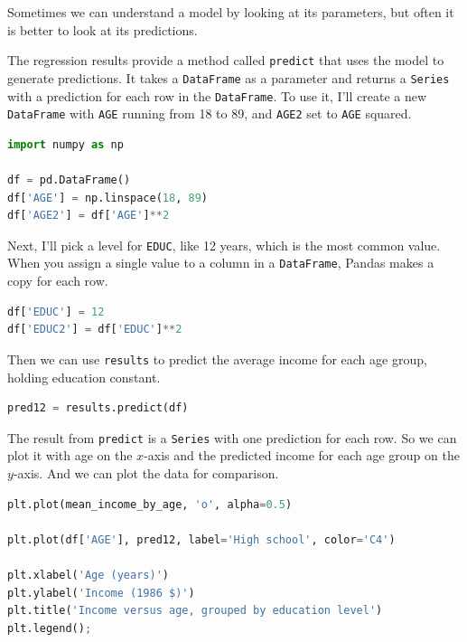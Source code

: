 Sometimes we can understand a model by looking at its parameters, but
often it is better to look at its predictions.

The regression results provide a method called
\passthrough{\lstinline!predict!} that uses the model to generate
predictions. It takes a \passthrough{\lstinline!DataFrame!} as a
parameter and returns a \passthrough{\lstinline!Series!} with a
prediction for each row in the \passthrough{\lstinline!DataFrame!}. To
use it, I'll create a new \passthrough{\lstinline!DataFrame!} with
\passthrough{\lstinline!AGE!} running from 18 to 89, and
\passthrough{\lstinline!AGE2!} set to \passthrough{\lstinline!AGE!}
squared.

\begin{lstlisting}[language=Python,style=source]
import numpy as np

df = pd.DataFrame()
df['AGE'] = np.linspace(18, 89)
df['AGE2'] = df['AGE']**2
\end{lstlisting}

Next, I'll pick a level for \passthrough{\lstinline!EDUC!}, like 12
years, which is the most common value. When you assign a single value to
a column in a \passthrough{\lstinline!DataFrame!}, Pandas makes a copy
for each row.

\begin{lstlisting}[language=Python,style=source]
df['EDUC'] = 12
df['EDUC2'] = df['EDUC']**2
\end{lstlisting}

Then we can use \passthrough{\lstinline!results!} to predict the average
income for each age group, holding education constant.

\begin{lstlisting}[language=Python,style=source]
pred12 = results.predict(df)
\end{lstlisting}

The result from \passthrough{\lstinline!predict!} is a
\passthrough{\lstinline!Series!} with one prediction for each row. So we
can plot it with age on the \(x\)-axis and the predicted income for each
age group on the \(y\)-axis. And we can plot the data for comparison.

\begin{lstlisting}[language=Python,style=source]
plt.plot(mean_income_by_age, 'o', alpha=0.5)

plt.plot(df['AGE'], pred12, label='High school', color='C4')

plt.xlabel('Age (years)')
plt.ylabel('Income (1986 $)')
plt.title('Income versus age, grouped by education level')
plt.legend();
\end{lstlisting}

